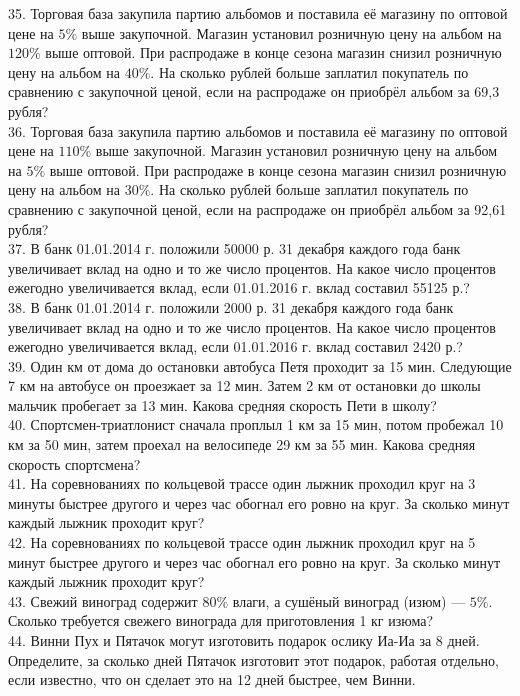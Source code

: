 \documentclass[12pt]{article}
\begin{document}
35. Торговая база закупила партию альбомов и поставила её магазину по оптовой цене на $5\%$ выше закупочной. Магазин установил розничную цену на альбом на $120\%$ выше оптовой. При распродаже в конце сезона магазин снизил розничную цену на альбом на $40\%.$ На сколько рублей больше заплатил покупатель по сравнению с закупочной ценой, если на распродаже он приобрёл альбом за 69,3 рубля?\\
36. Торговая база закупила партию альбомов и поставила её магазину по оптовой цене на $110\%$ выше закупочной. Магазин установил розничную цену на альбом на $5\%$ выше оптовой. При распродаже в конце сезона магазин снизил розничную цену на альбом на $30\%.$ На сколько рублей больше заплатил покупатель по сравнению с закупочной ценой, если на распродаже он приобрёл альбом за 92,61 рубля?\\
37. В банк 01.01.2014 г. положили 50000 р. 31 декабря каждого года банк увеличивает вклад на одно и то же число процентов. На какое число процентов ежегодно увеличивается вклад, если 01.01.2016 г. вклад составил 55125 р.?\\
38. В банк 01.01.2014 г. положили 2000 р. 31 декабря каждого года банк увеличивает вклад на одно и то же число процентов. На какое число процентов ежегодно увеличивается вклад, если 01.01.2016 г. вклад составил 2420 р.?\\
39. Один км от дома до остановки автобуса Петя проходит за 15 мин. Следующие 7 км на автобусе он проезжает за 12 мин. Затем 2 км от остановки до школы мальчик пробегает за 13 мин. Какова средняя скорость Пети в школу?\\
40. Спортсмен-триатлонист сначала проплыл 1 км за 15 мин, потом пробежал 10 км за 50 мин, затем проехал на велосипеде 29 км за 55 мин. Какова средняя скорость спортсмена?\\
41. На соревнованиях по кольцевой трассе один лыжник проходил круг на 3 минуты быстрее другого и через час обогнал его ровно на круг. За сколько минут каждый лыжник проходит круг?\\
42. На соревнованиях по кольцевой трассе один лыжник проходил круг на 5 минут быстрее другого и через час обогнал его ровно на круг. За сколько минут каждый лыжник проходит круг?\\
43. Свежий виноград содержит $80\%$ влаги, а сушёный виноград (изюм) --- $5\%.$ Сколько требуется свежего винограда для приготовления 1 кг изюма?\\
44. Винни Пух и Пятачок могут изготовить подарок ослику Иа-Иа за 8 дней. Определите, за сколько дней Пятачок изготовит этот подарок, работая отдельно, если известно, что он сделает это на 12 дней быстрее, чем Винни.\\
\end{document}
